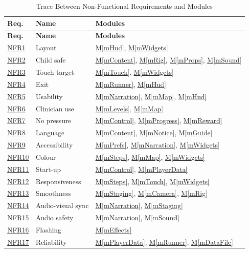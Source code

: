 \documentclass[12pt, titlepage]{article}
\newcommand{\mref}[1]{\hyperref[#1]{M\ref*{#1}}}
\newcommand{\srsurl}{https://team-hindsight.github.io/ophthamology-game/SRS/SRS.pdf}
\newcommand{\srsnfrref}[2]{\href{\srsurl\#nameddest=#1}{NFR#2}}
\begin{document}
\begin{longtable}{p{} p{} p{}}
\caption{Trace Between Non-Functional Requirements and Modules} \label{TblNRT}\\
\toprule
\textbf{Req.} & \textbf{Name} & \textbf{Modules}\\
\midrule
\endfirsthead
\toprule
\textbf{Req.} & \textbf{Name} & \textbf{Modules}\\
\midrule
\endhead
\srsnfrref{NFR_Layout}{1} & Layout & \mref{mHud}, \mref{mWidgets}\\
\srsnfrref{NFR_ChildSafe}{2} & Child safe & \mref{mContent}, \mref{mRig}, \mref{mProps}, \mref{mSound}\\
\srsnfrref{NFR_TouchTarget}{3} & Touch target & \mref{mTouch}, \mref{mWidgets}\\
\srsnfrref{NFR_Exit}{4} & Exit & \mref{mRunner}, \mref{mHud}\\
\srsnfrref{NFR_Usability}{5} & Usability & \mref{mNarration}, \mref{mMap}, \mref{mHud}\\
\srsnfrref{NFR_ClinicianUse}{6} & Clinician use & \mref{mLevels}, \mref{mMap}\\
\srsnfrref{NFR_NoPressure}{7} & No pressure & \mref{mControl}, \mref{mProgress}, \mref{mReward}\\
\srsnfrref{NFR_Language}{8} & Language & \mref{mContent}, \mref{mNotice}, \mref{mGuide}\\
\srsnfrref{NFR_Accessibility}{9} & Accessibility & \mref{mPrefs}, \mref{mNarration}, \mref{mWidgets}\\
\srsnfrref{NFR_Colour}{10} & Colour & \mref{mSteps}, \mref{mMap}, \mref{mWidgets}\\
\srsnfrref{NFR_Startup}{11} & Start-up & \mref{mControl}, \mref{mPlayerData}\\
\srsnfrref{NFR_Responsiveness}{12} & Responsiveness & \mref{mSteps}, \mref{mTouch}, \mref{mWidgets}\\
\srsnfrref{NFR_Smoothness}{13} & Smoothness & \mref{mStaging}, \mref{mCamera}, \mref{mRig}\\
\srsnfrref{NFR_AVSync}{14} & Audio-visual sync & \mref{mNarration}, \mref{mStaging}\\
\srsnfrref{NFR_AudioSafety}{15} & Audio safety & \mref{mNarration}, \mref{mSound}\\
\srsnfrref{NFR_Flashing}{16} & Flashing & \mref{mEffects}\\
\srsnfrref{NFR_Reliability}{17} & Reliability & \mref{mPlayerData}, \mref{mRunner}, \mref{mDataFile}\\

\end{longtable}
\end{document}
